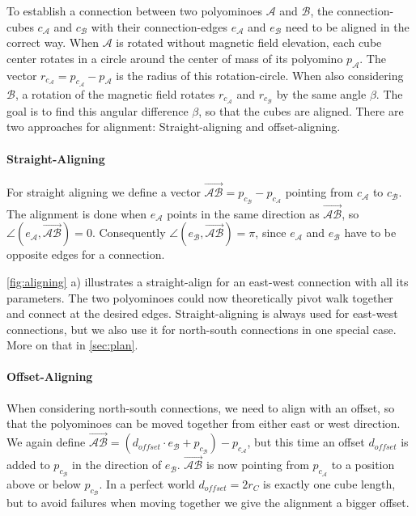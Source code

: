 To establish a connection between two polyominoes $\mathcal{A}$ and $\mathcal{B}$, the connection-cubes $c_\mathcal{A}$ and $c_\mathcal{B}$ with their connection-edges $e_\mathcal{A}$ and $e_\mathcal{B}$ need to be aligned in the correct way.
When $\mathcal{A}$ is rotated without magnetic field elevation, each cube center rotates in a circle around the center of mass of its polyomino $p_\mathcal{A}$.
The vector $r_{c_\mathcal{A}} = p_{c_\mathcal{A}} - p_\mathcal{A}$ is the radius of this rotation-circle.
When also considering $\mathcal{B}$, a rotation of the magnetic field rotates $r_{c_\mathcal{A}}$ and $r_{c_\mathcal{B}}$ by the same angle $\beta$.
The goal is to find this angular difference $\beta$, so that the cubes are aligned.
There are two approaches for alignment: Straight-aligning and offset-aligning.

\newpage

\paragraph{Straight-Aligning}

For straight aligning we define a vector $\overrightarrow{\mathcal{A}\mathcal{B}} = p_{c_\mathcal{B}} - p_{c_\mathcal{A}}$ pointing from $c_\mathcal{A}$ to $c_\mathcal{B}$.
The alignment is done when $e_\mathcal{A}$ points in the same direction as $\overrightarrow{\mathcal{A}\mathcal{B}}$, so $\angle \left( e_\mathcal{A}, \overrightarrow{\mathcal{A}\mathcal{B}} \right) = 0$.
Consequently $\angle \left( e_\mathcal{B}, \overrightarrow{\mathcal{A}\mathcal{B}} \right) = \pi$, since $e_\mathcal{A}$ and $e_\mathcal{B}$ have to be opposite edges for a connection.

\autoref{fig:aligning} a) illustrates a straight-align for an east-west connection with all its parameters.
The two polyominoes could now theoretically pivot walk together and connect at the desired edges.
Straight-aligning is always used for east-west connections, but we also use it for north-south connections in one special case. More on that in \autoref{sec:plan}.

\paragraph{Offset-Aligning}

When considering north-south connections, we need to align with an offset, so that the polyominoes can be moved together from either east or west direction.
We again define $\overrightarrow{\mathcal{A}\mathcal{B}} = \left( d_\textit{offset} \cdot e_\mathcal{B} + p_{c_\mathcal{B}} \right) - p_{c_\mathcal{A}}$, but this time an offset $d_\textit{offset}$ is added to $p_{c_\mathcal{B}}$ in the direction of $e_\mathcal{B}$.
$\overrightarrow{\mathcal{A}\mathcal{B}}$ is now pointing from $p_{c_\mathcal{A}}$ to a position above or below $p_{c_\mathcal{B}}$.
In a perfect world $d_\textit{offset} = 2 r_C$ is exactly one cube length, but to avoid failures when moving together we give the alignment a bigger offset.

